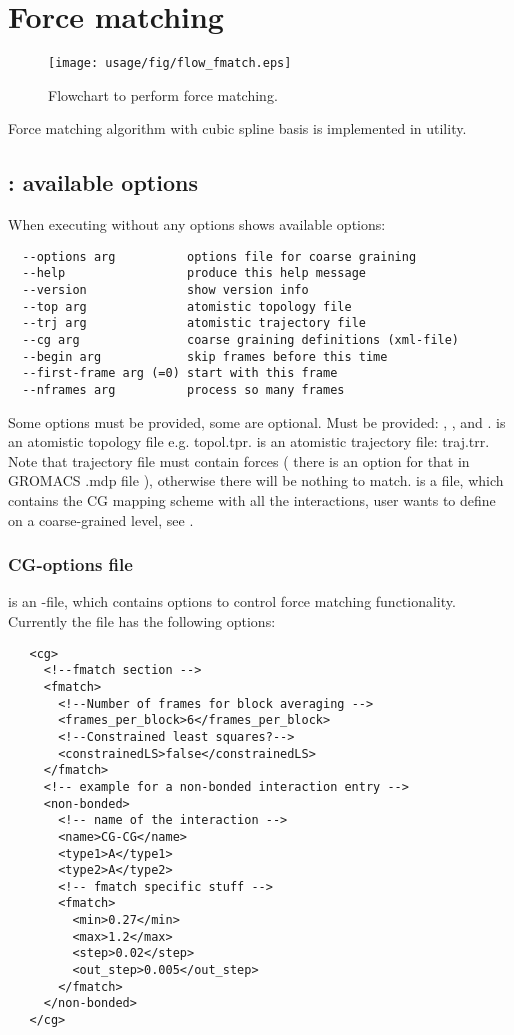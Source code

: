 \section{Force matching}
\sasha
\begin{figure}
   \centering
   \texttt{[image: usage/fig/flow\_fmatch.eps]}
   \caption{Flowchart to perform force matching.}
\end{figure}
Force matching algorithm with cubic spline basis is implemented in \csgfmatch utility.

\subsection{\csgfmatch: available options}
When executing without any options \csgfmatch shows available options:
\begin{verbatim}
  --options arg          options file for coarse graining
  --help                 produce this help message
  --version              show version info
  --top arg              atomistic topology file
  --trj arg              atomistic trajectory file
  --cg arg               coarse graining definitions (xml-file)
  --begin arg            skip frames before this time
  --first-frame arg (=0) start with this frame
  --nframes arg          process so many frames
\end{verbatim}
Some options must be provided, some are optional. Must be provided: , ,  and .  is an atomistic topology file e.g. topol.tpr.  is an atomistic trajectory file: traj.trr. Note that trajectory file must contain forces ( there is an option for that in GROMACS .mdp file ), otherwise there will be nothing to match.  is a file, which contains the CG mapping scheme with all the interactions, user wants to define on a coarse-grained level, see .

\subsubsection{CG-options file}
 is an \xml-file, which contains options to control force matching functionality. 
Currently the file has the following options:
\begin{verbatim}
   <cg>
     <!--fmatch section -->
     <fmatch>
       <!--Number of frames for block averaging -->
       <frames_per_block>6</frames_per_block>
       <!--Constrained least squares?-->
       <constrainedLS>false</constrainedLS>
     </fmatch>
     <!-- example for a non-bonded interaction entry -->
     <non-bonded>
       <!-- name of the interaction -->
       <name>CG-CG</name>
       <type1>A</type1>
       <type2>A</type2>
       <!-- fmatch specific stuff -->
       <fmatch>
         <min>0.27</min>
         <max>1.2</max>
         <step>0.02</step>
         <out_step>0.005</out_step>
       </fmatch>
     </non-bonded>
   </cg>
\end{verbatim}

